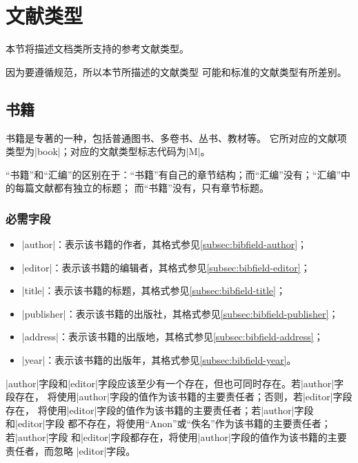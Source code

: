 \section{文献类型}\label{sec:bib-type}

本节将描述{\njuthesis}文档类所支持的参考文献类型。

\begin{note}
因为要遵循规范\cite{gbt7714-2005}，所以本节所描述的文献类型
可能和标准{\BibTeX}的文献类型有所差别。
\end{note}

\subsection{书籍}\label{subsec:bibtype-book}

书籍是专著的一种，包括普通图书、多卷书、丛书、教材等\cite{gbt3469-1983,gbt7714-2005}。
它所对应的{\BibTeX}文献项类型为|book|；对应的文献类型标志代码为|M|\cite{gbt3469-1983}。

\begin{note}
“书籍”和“汇编”的区别在于：“书籍”有自己的章节结构；而“汇编”没有；“汇编”中的每篇文献都有独立的标题；
而“书籍”没有，只有章节标题。
\end{note}

\subsubsection{必需字段}

\begin{itemize}
\item |author|：表示该书籍的作者，其格式参见\ref{subsec:bibfield-author}；
\item |editor|：表示该书籍的编辑者，其格式参见\ref{subsec:bibfield-editor}；
\item |title|：表示该书籍的标题，其格式参见\ref{subsec:bibfield-title}；
\item |publisher|：表示该书籍的出版社，其格式参见\ref{subsec:bibfield-publisher}；
\item |address|：表示该书籍的出版地，其格式参见\ref{subsec:bibfield-address}；
\item |year|：表示该书籍的出版年，其格式参见\ref{subsec:bibfield-year}。
\end{itemize}

\begin{note}
|author|字段和|editor|字段应该至少有一个存在，但也可同时存在。若|author|字段存在，
{\BibTeX}将使用|author|字段的值作为该书籍的主要责任者；否则，若|editor|字段存在，
{\BibTeX}将使用|editor|字段的值作为该书籍的主要责任者；若|author|字段和|editor|字段
都不存在，{\BibTeX}将使用``Anon''或``佚名''作为该书籍的主要责任者；若|author|字段
和|editor|字段都存在，{\BibTeX}将使用|author|字段的值作为该书籍的主要责任者，而忽略
|editor|字段。
\end{note}

